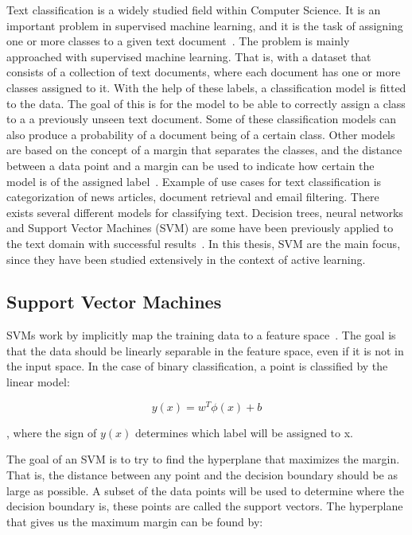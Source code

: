 Text classification is a widely studied field within Computer Science.
It is an important problem in supervised machine learning, and it is the task of assigning one or more classes to a given text document~\cite{aggarwal2012surveyclass}.
The problem is mainly approached with supervised machine learning.
That is, with a dataset that consists of a collection of text documents, where each document has one or more classes assigned to it. %
With the help of these labels, a classification model is fitted to the data.
The goal of this is for the model to be able to correctly assign a class to a a previously unseen text document.
Some of these classification models can also produce a probability of a document being of a certain class.
Other models are based on the concept of a margin that separates the classes, and the distance between a data point and a margin can be used to indicate how certain the model is of the assigned label~\cite{tong2001support}.
Example of use cases for text classification is categorization of news articles, document retrieval and email filtering.
There exists several different models for classifying text.
Decision trees, neural networks and Support Vector Machines (SVM) are some have been previously applied to the text domain with successful results~\cite{aggarwal2012survey}.
In this thesis, SVM are the main focus, since they have been studied extensively in the context of active learning. %

\subsection{Support Vector Machines}

SVMs work by implicitly map the training data to a feature space~\cite{bishop2006pattern}.
The goal is that the data should be linearly separable in the feature space, even if it is not in the input space.
In the case of binary classification, a point is classified by the linear model:

\begin{equation}\label{eq:svm-y}
    y(x) = w^T \phi(x) + b
\end{equation}

, where the sign of $y(x)$ determines which label will be assigned to x.

The goal of an SVM is to try to find the hyperplane that maximizes the margin.
That is, the distance between any point and the decision boundary should be as large as possible.
A subset of the data points will be used to determine where the decision boundary is, these points are called the support vectors.
The hyperplane that gives us the maximum margin can be found by:

